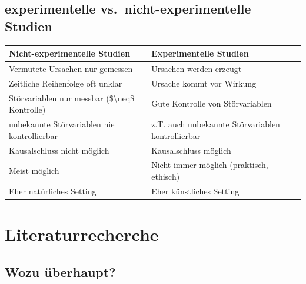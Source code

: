 \documentclass[
]{book}
\begin{document}
\hypertarget{experimentelle-vs.-nicht-experimentelle-studien-1}{%
\subsection{experimentelle vs.~nicht-experimentelle Studien}\label{experimentelle-vs.-nicht-experimentelle-studien-1}}

\begin{tabular}[t]{ll}
\toprule
Nicht-experimentelle Studien &  Experimentelle Studien\\
\midrule
Vermutete Ursachen nur gemessen & Ursachen werden erzeugt\\
Zeitliche Reihenfolge oft unklar & Ursache kommt vor Wirkung\\
Störvariablen nur messbar (\$\textbackslash{}neq\$ Kontrolle) & Gute Kontrolle von Störvariablen\\
unbekannte Störvariablen nie kontrollierbar & z.T. auch unbekannte Störvariablen kontrollierbar\\
Kausalschluss nicht möglich & Kausalschluss möglich\\
\addlinespace
Meist möglich & Nicht immer möglich (praktisch, ethisch)\\
Eher natürliches Setting & Eher künstliches Setting\\
\bottomrule
\end{tabular}

\hypertarget{literaturrecherche-1}{%
\section{Literaturrecherche}\label{literaturrecherche-1}}

\hypertarget{wozu-uxfcberhaupt}{%
\subsection{Wozu überhaupt?}\label{wozu-uxfcberhaupt}}
\end{document}
